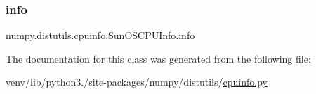 \subsubsection{\texorpdfstring{info}{info}}
{\footnotesize\ttfamily numpy.\+distutils.\+cpuinfo.\+Sun\+O\+S\+C\+P\+U\+Info.\+info\hspace{0.3cm}{\ttfamily [static]}}



The documentation for this class was generated from the following file\+:\begin{DoxyCompactItemize}
\item 
venv/lib/python3./site-\/packages/numpy/distutils/\hyperlink{cpuinfo_8py}{cpuinfo.\+py}\end{DoxyCompactItemize}
